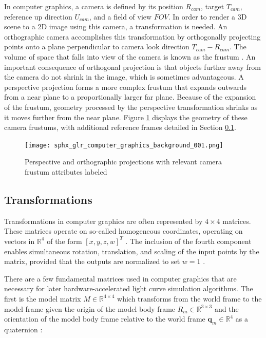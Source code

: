 In computer graphics, a camera is defined by its position $R_{cam}$, target $T_{cam}$, reference up direction $U_{cam}$, and a field of view $FOV$. In order to render a 3D scene to a 2D image using this camera, a transformation is needed. An orthographic camera accomplishes this transformation by orthogonally projecting points onto a plane perpendicular to camera look direction $T_{cam} - R_{cam}$. The volume of space that falls into view of the camera is known as the frustum \cite{shirley2009}. An important consequence of orthogonal projection is that objects further away from the camera do not shrink in the image, which is sometimes advantageous. A perspective projection forms a more complex frustum that expands outwards from a near plane to a proportionally larger far plane. Because of the expansion of the frustum, geometry processed by the perspective transformation shrinks as it moves further from the near plane. Figure \ref{fig:ortho_perspective_cameras} displays the geometry of these camera frustums, with additional reference frames detailed in Section \ref{sec:graphics_trans}.

\begin{figure}[!htb]
  \centering
  \texttt{[image: sphx\_glr\_computer\_graphics\_background\_001.png]}
  \caption{Perspective and orthographic projections with relevant camera frustum attributes labeled}
  \label{fig:ortho_perspective_cameras}
\end{figure}

\subsection{Transformations} \label{sec:graphics_trans}

Transformations in computer graphics are often represented by $4 \times 4$ matrices. These matrices operate on so-called homogeneous coordinates, operating on vectors in $\mathbb{R}^4$ of the form $\left[ x, y, z, w \right]^T$ \cite{shirley2009}. The inclusion of the fourth component enables simultaneous rotation, translation, and scaling of the input points by the matrix, provided that the outputs are normalized to set $w = 1$ \cite{shirley2009}.

There are a few fundamental matrices used in computer graphics that are necessary for later hardware-accelerated light curve simulation algorithms. The first is the model matrix $M \in \mathbb{R}^{4 \times 4}$ which transforms from the world frame to the model frame given the origin of the model body frame $R_{m} \in \mathbb{R}^{3 \times 3}$ and the orientation of the model body frame relative to the world frame $\mathbf{q}_m \in \mathbb{R}^4$ as a quaternion \cite{shirley2009}:


